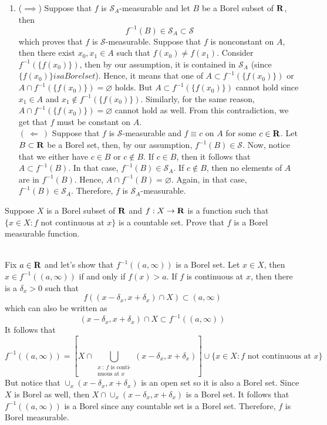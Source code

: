 \begin{solution}
\begin{enumerate}[label = (\alph*)]
        \item ($\implies$) Suppose that $f$ is $\mathcal{S}_A$-measurable and let $B$ be a Borel subset of $\mathbf{R}$, then
        $$f^{-1}(B) \in \mathcal{S}_A \subset \mathcal{S}$$
        which proves that $f$ is $\mathcal{S}$-measurable. Suppose that $f$ is nonconstant on $A$, then there exist $x_0, x_1 \in A$ such that $f(x_0) \neq f(x_1)$. Consider $f^{-1}(\{f(x_0)\})$, then by our assumption, it is contained in $\mathcal{S}_A$ (since $\{f(x_0)\} is a Borel set$). Hence, it means that one of $A \subset f^{-1}(\{f(x_0)\})$ or $A\cap f^{-1}(\{f(x_0)\}) = \varnothing$ holds. But $A \subset f^{-1}(\{f(x_0)\})$ cannot hold since $x_1 \in A$ and $x_1 \notin f^{-1}(\{f(x_0)\})$. Similarly, for the same reason, $A\cap f^{-1}(\{f(x_0)\}) = \varnothing$ cannot hold as well. From this contradiction, we get that $f$ must be constant on $A$. \\
        $ ( \ \Longleftarrow \ ) $  Suppose that $f$ is $\mathcal{S}$-measurable and $f \equiv c$ on $A$ for some $c \in \mathbf{R}$. Let $B \subset \mathbf{R}$ be a Borel set, then, by our assumption, $f^{-1}(B) \in \mathcal{S}$. Now, notice that we either have $c \in B$ or $c \notin B$. If $c \in B$, then it follows that $A \subset f^{-1}(B)$. In that case, $f^{-1}(B) \in \mathcal{S}_A$. If $c \notin B$, then no elements of $A$ are in $f^{-1}(B)$. Hence, $A \cap f^{-1}(B) = \varnothing$. Again, in that case, $f^{-1}(B) \in \mathcal{S}_A$. Therefore, $f$ is $\mathcal{S}_A$-measurable. \\
     \end{enumerate}
\end{solution}

\begin{exercise}
    Suppose $X$ is a Borel subset of $\mathbf{R}$ and $f : X \to \mathbf{R}$ is a function such that $\{x \in X : f \text{ not continuous at } x\}$ is a countable set. Prove that $f$ is a Borel measurable function. \\
\end{exercise}

\begin{solution}
    \\ Fix $a \in \mathbf{R}$ and let's show that $f^{-1}((a, \infty))$ is a Borel set. Let $x \in X$, then $x \in f^{-1}((a, \infty))$ if and only if $f(x) > a$. If $f$ is continuous at $x$, then there is a $\delta_x > 0$ such that 
    $$f((x - \delta_x, x + \delta_x)\cap X) \subset (a, \infty)$$
    which can also be written as 
    $$(x - \delta_x, x + \delta_x)\cap X \subset f^{-1}((a, \infty))$$
    It follows that 
    $$f^{-1}((a, \infty)) = \left[ X \cap \bigcup_{\substack{x \ : \ f \text{ is conti-} \\ \text{nuous at } x }}(x - \delta_x, x + \delta_x)\right] \cup \{x \in X : f \text{ not continuous at } x\}$$
    But notice that $\cup_{x}(x - \delta_x, x + \delta_x)$ is an open set so it is also a Borel set. Since $X$ is Borel as well, then $X \cap \cup_{x}(x - \delta_x, x + \delta_x)$ is a Borel set. It follows that $f^{-1}((a, \infty))$ is a Borel since any countable set is a Borel set. Therefore, $f$ is Borel measurable.\\
\end{solution}


